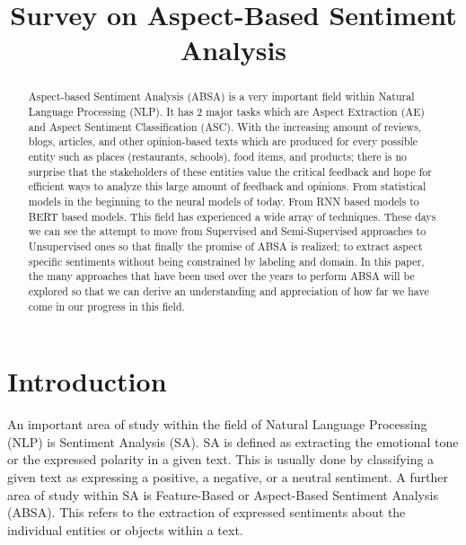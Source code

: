 \documentclass[conference]{IEEEtran}
\begin{document}
\title{Survey on Aspect-Based Sentiment Analysis}

\author{
}

\maketitle
\thispagestyle{plain}
\pagestyle{plain}

\begin{abstract}
Aspect-based Sentiment Analysis (ABSA) is a very important field within Natural Language Processing (NLP). It has 2 major tasks which are Aspect Extraction (AE) and Aspect Sentiment Classification (ASC). With the increasing amount of reviews, blogs, articles, and other opinion-based texts which are produced for every possible entity such as places (restaurants, schools), food items, and products; there is no surprise that the stakeholders of these entities value the critical feedback and hope for efficient ways to analyze this large amount of feedback and opinions. From statistical models in the beginning to the neural models of today. From RNN based models to BERT based models. This field has experienced a wide array of techniques. These days we can see the attempt to move from Supervised and Semi-Supervised approaches to Unsupervised ones so that finally the promise of ABSA is realized; to extract aspect specific sentiments without being constrained by labeling and domain. In this paper, the many approaches that have been used over the years to perform ABSA will be explored so that we can derive an understanding and appreciation of how far we have come in our progress in this field.
\end{abstract}

\section{Introduction}
An important area of study within the field of Natural Language Processing (NLP) is Sentiment Analysis (SA). SA is defined as extracting the emotional tone or the expressed polarity in a given text. This is usually done by classifying a given text as expressing a positive, a negative, or a neutral sentiment. A further area of study within SA is Feature-Based or Aspect-Based Sentiment Analysis (ABSA). This refers to the extraction of expressed sentiments about the individual entities or objects within a text.
\end{document}
